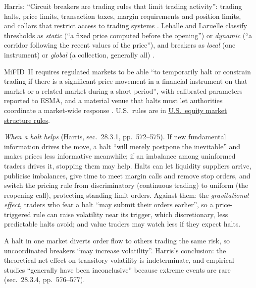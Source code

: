 \begin{qfmechanism}\label{mech:circuit-breakers-trading-halts}
 Harris: ``Circuit breakers are trading rules that limit trading activity'': trading halts, price limits, transaction taxes, margin requirements and position limits, and collars that restrict access to trading systems \citep[chap.~28, sec.~28.3, p.~572]{alpha-harris}. Lehalle and Laruelle classify thresholds as \emph{static} (``a fixed price computed before the opening'') or \emph{dynamic} (``a corridor following the recent values of the price''), and breakers as \emph{local} (one instrument) or \emph{global} (a collection, generally all) \citep[chap.~2, sec.~2.5.3, pp.~187--188]{alpha-laruelle}.

MiFID~II requires regulated markets to be able ``to temporarily halt or constrain trading if there is a significant price movement in a financial instrument on that market or a related market during a short period'', with calibrated parameters reported to ESMA, and a material venue that halts must let authorities coordinate a market-wide response \citep[Art.~48(5)]{eu-dir-2014-65}. U.S.\ rules are in \hyperref[rule:us-equity-market-structure]{U.S.\ equity market structure rules}.

 \emph{When a halt helps} (Harris, sec.~28.3.1, pp.~572--575). If new fundamental information drives the move, a halt ``will merely postpone the inevitable'' and makes prices less informative meanwhile; if an imbalance among uninformed traders drives it, stopping them may help. Halts can let liquidity suppliers arrive, publicise imbalances, give time to meet margin calls and remove stop orders, and switch the pricing rule from discriminatory (continuous trading) to uniform (the reopening call), protecting standing limit orders. Against them: the \emph{gravitational effect}, traders who fear a halt ``may submit their orders earlier'', so a price-triggered rule can raise volatility near its trigger, which discretionary, less predictable halts avoid; and value traders may watch less if they expect halts.

A halt in one market diverts order flow to others trading the same risk, so uncoordinated breakers ``may increase volatility''. Harris's conclusion: the theoretical net effect on transitory volatility is indeterminate, and empirical studies ``generally have been inconclusive'' because extreme events are rare (sec.~28.3.4, pp.~576--577).


\end{qfmechanism}
